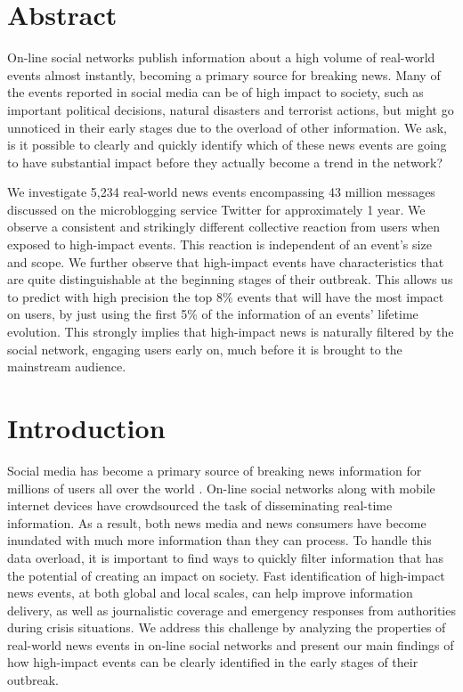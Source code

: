 \documentclass[10pt,letterpaper]{article}
\begin{document}
\section*{Abstract}
On-line social networks publish information about a high volume of
real-world events almost instantly, becoming a primary source for
breaking news. Many of the events reported in social media can be
of high impact to society, such as important political decisions, natural disasters and terrorist actions, but might go unnoticed in their
early stages due to the overload of other information. We ask, is it
possible to clearly and quickly identify which of these news events
are going to have substantial impact before they actually become a
trend in the network?

We investigate 5,234 real-world news events encompassing 43 million
messages discussed on the
microblogging service Twitter for approximately 1 year.
%
We observe a consistent and
strikingly different collective reaction from users when exposed to
high-impact events. This reaction is independent of an event’s size
and scope. We further observe that high-impact events have characteristics that are quite distinguishable at the beginning stages of
their outbreak. This allows us to predict with high precision the top
8\% events that will have the most impact on users, by just using
the first 5\% of the information of an events' lifetime evolution. This
strongly implies that high-impact news is naturally filtered by the
social network, engaging users early on, much before it is brought to
the mainstream audience.

\linenumbers

\section*{Introduction}

Social media has become a primary source of breaking news information
for millions of users all over the world \cite{Kwak:2010}. On-line
social networks along with mobile internet devices have crowdsourced
the task of disseminating real-time information. As a result, both
news media and news consumers have become inundated with much more
information than they can process. To handle this data overload, it is
important to find ways to quickly filter information that has the
potential of creating an impact on society. Fast identification of
high-impact news events, at both global and local scales, can help
improve information delivery, as well as journalistic coverage and
emergency responses from authorities during crisis situations. We
address this challenge by analyzing the properties of real-world news
events in on-line social networks and present our main findings of how
high-impact events can be clearly identified in the early stages of
their outbreak.
\end{document}
